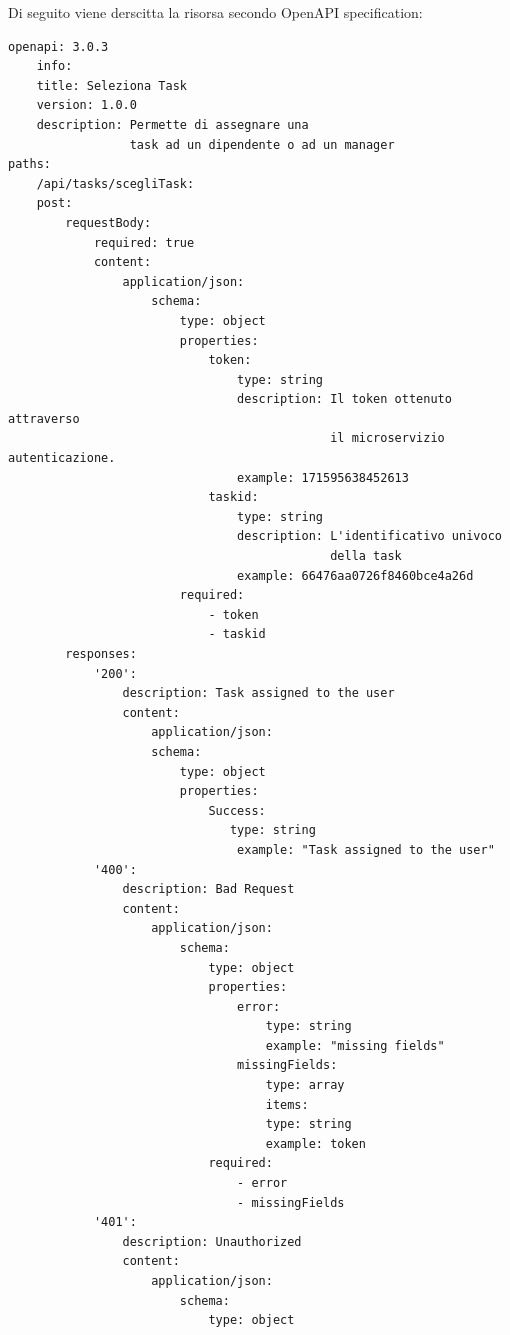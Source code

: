 \documentclass{report}
\begin{document}
Di seguito viene derscitta la risorsa secondo OpenAPI specification:


\begin{verbatim}
openapi: 3.0.3
    info:
    title: Seleziona Task
    version: 1.0.0
    description: Permette di assegnare una
                 task ad un dipendente o ad un manager
paths:
    /api/tasks/scegliTask:
    post:
        requestBody:
            required: true
            content:
                application/json:
                    schema:
                        type: object
                        properties:
                            token:
                                type: string
                                description: Il token ottenuto attraverso
                                             il microservizio autenticazione.
                                example: 171595638452613
                            taskid:
                                type: string
                                description: L'identificativo univoco
                                             della task
                                example: 66476aa0726f8460bce4a26d
                        required:
                            - token
                            - taskid
        responses:
            '200':
                description: Task assigned to the user
                content:
                    application/json:
                    schema:
                        type: object
                        properties:
                            Success:
                               type: string
                                example: "Task assigned to the user"
            '400':
                description: Bad Request
                content:
                    application/json:
                        schema:
                            type: object
                            properties:
                                error:
                                    type: string
                                    example: "missing fields"
                                missingFields:
                                    type: array
                                    items:
                                    type: string
                                    example: token
                            required:
                                - error
                                - missingFields
            '401':
                description: Unauthorized
                content:
                    application/json:
                        schema:
                            type: object

\end{verbatim}
\end{document}
